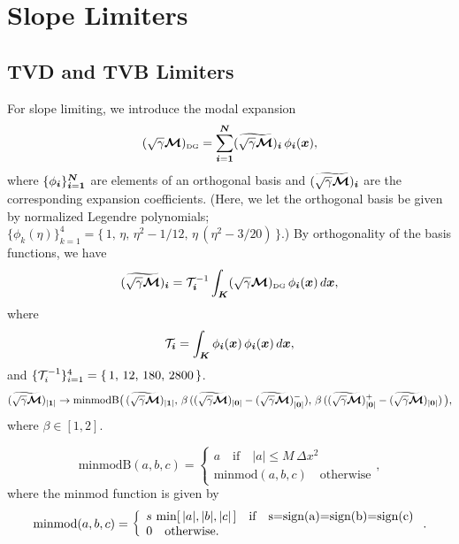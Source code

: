 \documentclass[10pt,preprint]{aastex}
\begin{document}
\section{Slope Limiters}

\subsection{TVD and TVB Limiters}

For slope limiting, we introduce the modal expansion
\begin{equation}
  (\sqrt{\gamma}\boldsymbol{\mathcal{M}})_{\mbox{\tiny DG}}=\sum_{\boldsymbol{i}=\boldsymbol{1}}^{\boldsymbol{N}}(\widetilde{\sqrt{\gamma}\boldsymbol{\mathcal{M}}})_{\boldsymbol{i}}\,\phi_{\boldsymbol{i}}(\boldsymbol{x}),
\end{equation}
where $\{\phi_{\boldsymbol{i}}\}_{\boldsymbol{i}=\boldsymbol{1}}^{\boldsymbol{N}}$ are elements of an orthogonal basis and $(\widetilde{\sqrt{\gamma}\boldsymbol{\mathcal{M}}})_{\boldsymbol{i}}$ are the corresponding expansion coefficients.  
(Here, we let the orthogonal basis be given by normalized Legendre polynomials; $\{\phi_{k}(\eta)\}_{k=1}^{4}=\{\,1,\,\eta,\,\eta^{2}-1/12,\,\eta\,(\eta^{2}-3/20)\,\}$.)  
By orthogonality of the basis functions, we have
\begin{equation}
  (\widetilde{\sqrt{\gamma}\boldsymbol{\mathcal{M}}})_{\boldsymbol{i}}
  =\mathcal{T}_{\boldsymbol{i}}^{-1}\int_{\boldsymbol{K}}(\sqrt{\gamma}\boldsymbol{\mathcal{M}})_{\mbox{\tiny DG}}\,\phi_{\boldsymbol{i}}(\boldsymbol{x})\,d\boldsymbol{x},
\end{equation}
where
\begin{equation}
  \mathcal{T}_{\boldsymbol{i}}=\int_{\boldsymbol{K}}\phi_{\boldsymbol{i}}(\boldsymbol{x})\,\phi_{\boldsymbol{i}}(\boldsymbol{x})\,d\boldsymbol{x},
\end{equation}
and $\{\mathcal{T}_{i}^{-1}\}_{i=1}^{4}=\{\,1,\,12,\,180,\,2800\,\}$.  
\begin{equation}
  (\widetilde{\sqrt{\gamma}\boldsymbol{\mathcal{M}}})_{|\boldsymbol{1}|}
  \to\text{minmodB}
  \big(\,
    (\widetilde{\sqrt{\gamma}\boldsymbol{\mathcal{M}}})_{|\boldsymbol{1}|},\,
    \beta\,((\widetilde{\sqrt{\gamma}\boldsymbol{\mathcal{M}}})_{|\boldsymbol{0}|}-(\widetilde{\sqrt{\gamma}\boldsymbol{\mathcal{M}}})_{|\boldsymbol{0}|}^{-}),\,
    \beta\,((\widetilde{\sqrt{\gamma}\boldsymbol{\mathcal{M}}})_{|\boldsymbol{0}|}^{+}-(\widetilde{\sqrt{\gamma}\boldsymbol{\mathcal{M}}})_{|\boldsymbol{0}|})
  \,\big),
\end{equation}
where $\beta\in[1,2]$.  

\citet{cockburnShu_2001}
\begin{equation}
  \mbox{minmodB}(a,b,c)
  =\left\{\begin{array}{ll}
  a \quad\text{if}\quad |a|\le M\,\Delta x^{2} \\
  \mbox{minmod}(a,b,c) \quad \text{otherwise}
  \end{array}\right.,
\end{equation}
where the minmod function is given by
\begin{equation}
  \mbox{minmod}(a,b,c)
  =\left\{\begin{array}{ll}
  s\,\min[\,|a|,|b|,|c|\,] \quad\text{if}\quad $s=\mbox{sign}(a)=\mbox{sign}(b)=\mbox{sign}(c)$ \\
  0 \quad \text{otherwise}.
  \end{array}\right..
\end{equation}
\end{document}
